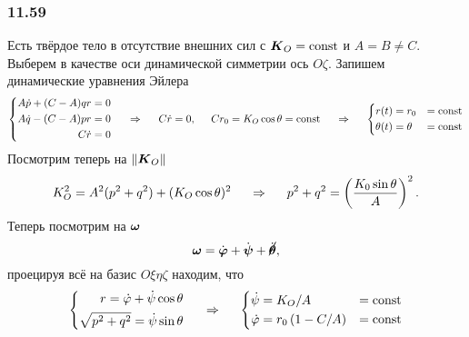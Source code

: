 \subsubsection*{11.59}

Есть твёрдое тело в отсутствие внешних сил с $\mbox{\boldmath $K$}_O = \text{const}$ и $A = B \neq C$. Выберем в качестве оси динамической симметрии ось $O\zeta$. Запишем динамические уравнения Эйлера
\begin{equation*}
    \left\{\begin{aligned}
        A \dot{p} + (C-A) qr &= 0 \\
        A \dot{q} - (C-A) pr &= 0 \\
        C \dot{r} &= 0
    \end{aligned}\right.
    \hspace{0.5cm} \Rightarrow \hspace{0.5cm} 
    C \dot{r} = 0, \hspace{0.5cm} Cr_0 = K_O \cos \theta = \text{const}
    \hspace{0.5cm} \Rightarrow \hspace{0.5cm} 
    \left\{\begin{aligned}
        r(t) &= r_0 &= \text{const}\\
        \theta(t) &= \theta &= \text{const}
    \end{aligned}\right.
\end{equation*}
Посмотрим теперь на $\|\mbox{\boldmath $K$}_O\|$
\begin{equation*}
    K_O^2 = A^2 (p^2 + q^2) + (K_O \cos \theta)^2
    \hspace{0.5cm} \Rightarrow \hspace{0.5cm} 
    p^2 + q^2 = \left(\frac{K_0 \sin \theta}{A} \right)^2.
\end{equation*}
Теперь посмотрим на $\mbox{\boldmath $\omega$}$
\begin{equation*}
    \mbox{\boldmath $\omega$} = \dot{\mbox{\boldmath $\varphi$}} + \dot{\mbox{\boldmath $\psi$}} + \cancel{\dot{\mbox{\boldmath $\theta$}}},
\end{equation*}
проецируя всё на базис $O\xi\eta\zeta$ находим, что
\begin{equation*}
    \left\{\begin{aligned}
        r = \dot{\varphi} + \dot{\psi} \cos \theta \\
        \sqrt{p^2 + q^2} = \dot{\psi} \sin \theta       
    \end{aligned}\right.
    \hspace{0.5cm} \Rightarrow \hspace{0.5cm} 
   \left\{\begin{aligned}
       \dot{\psi} &= {K_O}/{A} &= \text{const} \\
       \dot{\varphi} &= r_0 \left(1 - {C}/{A} \right) &=\text{const}
   \end{aligned}\right.
\end{equation*}
